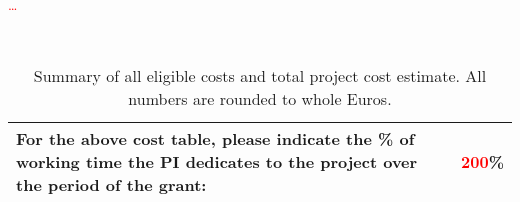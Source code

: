 \documentclass[B2]{ercgrant}
\begin{document}
\textcolor{red}{\blindtext[2]}

\textcolor{red}{\ldots}


\begin{table}[h]
\begin{center}
\\[0.8cm]

\setlength{\arrayrulewidth}{1.35pt}
\def\arraystretch{1.5}
\begin{tabular}{|p{0.634\hsize}|C{0.108\hsize}|}
\hline
\textbf{For the above cost table, please indicate the \% of working time
the PI dedicates to the project over the period of the grant:}
& \textbf{\textcolor{red}{200}\%}\\
\hline
\end{tabular}
\caption{Summary of all eligible costs and total project cost estimate. All numbers are rounded to
whole Euros.}
\label{tab:budget}
\end{center}
\end{table}



\nocite{*} %

\renewcommand\bibsection{\section*{\refname}}


\end{document}
